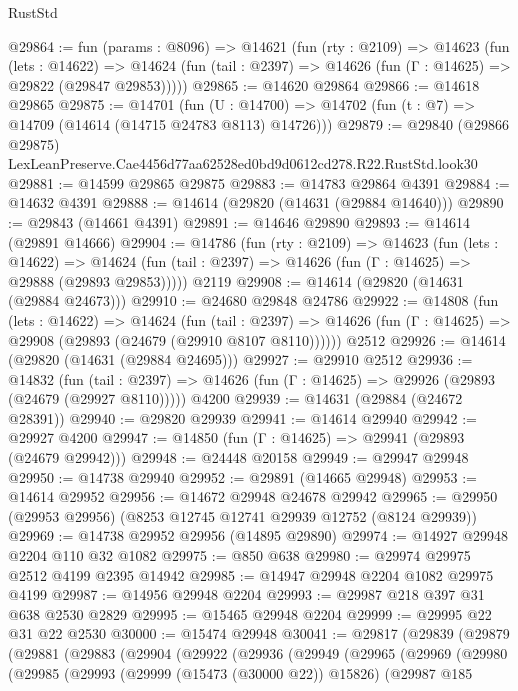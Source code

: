 \begin{lexlean}{RustStd}
\begin{coremodule}
@29864 := fun (params : @8096) =>
  @14621
    (fun (rty : @2109) =>
    @14623
      (fun (lets : @14622) =>
      @14624 (fun (tail : @2397) => @14626 (fun (Γ : @14625) => @29822 (@29847 @29853)))))
@29865 := @14620 @29864
@29866 := @14618 @29865
@29875 := @14701
    (fun (U : @14700) => @14702 (fun (t : @7) => @14709 (@14614 (@14715 @24783 @8113) @14726)))
@29879 := @29840
    (@29866 @29875)
    LexLeanPreserve.Cae4456d77aa62528ed0bd9d0612cd278.R22.RustStd.look30
@29881 := @14599 @29865 @29875
@29883 := @14783 @29864 @4391
@29884 := @14632 @4391
@29888 := @14614 (@29820 (@14631 (@29884 @14640)))
@29890 := @29843 (@14661 @4391)
@29891 := @14646 @29890
@29893 := @14614 (@29891 @14666)
@29904 := @14786
    (fun (rty : @2109) =>
    @14623
      (fun (lets : @14622) =>
      @14624 (fun (tail : @2397) => @14626 (fun (Γ : @14625) => @29888 (@29893 @29853)))))
    @2119
@29908 := @14614 (@29820 (@14631 (@29884 @24673)))
@29910 := @24680 @29848 @24786
@29922 := @14808
    (fun (lets : @14622) =>
    @14624
      (fun (tail : @2397) =>
      @14626 (fun (Γ : @14625) => @29908 (@29893 (@24679 (@29910 @8107 @8110))))))
    @2512
@29926 := @14614 (@29820 (@14631 (@29884 @24695)))
@29927 := @29910 @2512
@29936 := @14832
    (fun (tail : @2397) => @14626 (fun (Γ : @14625) => @29926 (@29893 (@24679 (@29927 @8110)))))
    @4200
@29939 := @14631 (@29884 (@24672 @28391))
@29940 := @29820 @29939
@29941 := @14614 @29940
@29942 := @29927 @4200
@29947 := @14850 (fun (Γ : @14625) => @29941 (@29893 (@24679 @29942)))
@29948 := @24448 @20158
@29949 := @29947 @29948
@29950 := @14738 @29940
@29952 := @29891 (@14665 @29948)
@29953 := @14614 @29952
@29956 := @14672 @29948 @24678 @29942
@29965 := @29950 (@29953 @29956) (@8253 @12745 @12741 @29939 @12752 (@8124 @29939))
@29969 := @14738 @29952 @29956 (@14895 @29890)
@29974 := @14927 @29948 @2204 @110 @32 @1082
@29975 := @850 @638
@29980 := @29974 @29975 @2512 @4199 @2395 @14942
@29985 := @14947 @29948 @2204 @1082 @29975 @4199
@29987 := @14956 @29948 @2204
@29993 := @29987 @218 @397 @31 @638 @2530 @2829
@29995 := @15465 @29948 @2204
@29999 := @29995 @22 @31 @22 @2530
@30000 := @15474 @29948
@30041 := @29817
    (@29839
      (@29879
        (@29881
          (@29883
            (@29904
              (@29922
                (@29936
                  (@29949
                    (@29965
                      (@29969
                        (@29980
                          (@29985
                            (@29993
                              (@29999 (@15473 (@30000 @22)) @15826)
                              (@29987
                                @185

\end{coremodule}
\end{lexlean}
